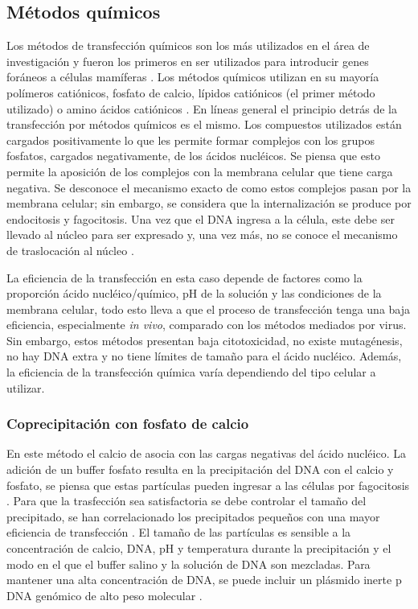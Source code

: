 \documentclass[fleqn,10pt]{SelfArx} %
\begin{document}
\subsection{Métodos químicos}
Los métodos de transfección químicos son los más utilizados en el área de investigación y fueron los primeros en ser utilizados para introducir genes foráneos a células mamíferas \cite{Schenborn2000}. Los métodos químicos utilizan en su mayoría polímeros catiónicos, fosfato de calcio, lípidos catiónicos (el primer método utilizado) o amino ácidos catiónicos \cite{Schenborn2000, Holmen:1995aa, Washbourne:2002aa}. En líneas general el principio detrás de la transfección por métodos químicos es el mismo. Los compuestos utilizados están cargados positivamente lo que les permite formar complejos con los grupos fosfatos, cargados negativamente, de los ácidos nucléicos. Se piensa que esto permite la aposición de los complejos con la membrana celular que tiene carga negativa. Se desconoce el mecanismo exacto de como estos complejos pasan por la membrana celular; sin embargo, se considera que la internalización se produce por endocitosis y fagocitosis. Una vez que el DNA ingresa a la célula, este debe ser llevado al núcleo para ser expresado y, una vez más, no se conoce el mecanismo de traslocación al núcleo \cite{Kim:2010aa}. 

La eficiencia de la transfección en esta caso depende de factores como la proporción ácido nucléico/químico, pH de la solución y las condiciones de la membrana celular, todo esto lleva a que el proceso de transfección tenga una baja eficiencia, especialmente \textit{in vivo}, comparado con los métodos mediados por virus. Sin embargo, estos métodos presentan baja citotoxicidad, no existe mutagénesis, no hay DNA extra y no tiene límites de tamaño para el ácido nucléico. Además, la eficiencia de la transfección química varía dependiendo del tipo celular a utilizar.

\subsubsection*{Coprecipitación con fosfato de calcio}
En este método el calcio de asocia con las cargas negativas del ácido nucléico. La adición de un buffer fosfato resulta en la precipitación del DNA con el calcio y fosfato, se piensa que estas partículas pueden ingresar a las células por fagocitosis \cite{Loyter:1982aa}. Para que la trasfección sea satisfactoria se debe controlar el tamaño del precipitado, se han correlacionado los precipitados pequeños con una mayor eficiencia de transfección \cite{Jordan:1996aa}. El tamaño de las partículas es sensible a la concentración de calcio, DNA, pH y temperatura durante la precipitación y el modo en el que el buffer salino y la solución de DNA son mezcladas. Para mantener una alta concentración de DNA, se puede incluir un plásmido inerte p DNA genómico de alto peso molecular \cite{Strain:1985aa}.
\end{document}
